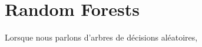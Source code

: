 \chapter{Random Forests}
Lorsque nous parlons d'arbres de décisions aléatoires, 

\inputminted{python}{code/machine-learning/random-forests-classification.py}